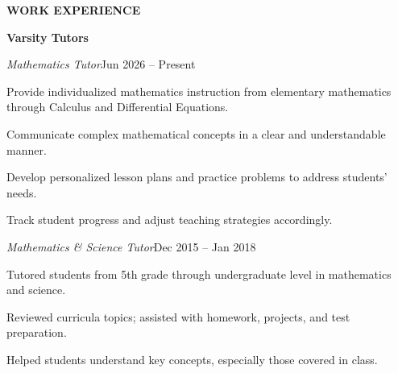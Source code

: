 \documentclass[a4paper, 12pt]{article}
\newcommand{\workplace}[1]{%
  \noindent\textbf{#1}\par
}
\newcommand{\workrole}[2]{%
  \noindent\hspace*{1em}\textit{#1}\hfill #2\par
}
\begin{document}
\begin{flushleft}
\faSuitcase\quad\textbf{WORK EXPERIENCE}\\[4pt]

\noindent\begin{minipage}{\linewidth}
\workplace{Varsity Tutors}
\workrole{Mathematics Tutor}{Jun 2026 -- Present}
\begin{compactitem}
    \item Provide individualized mathematics instruction from elementary mathematics
          through Calculus and Differential Equations.
    \item Communicate complex mathematical concepts in a clear and understandable manner.
    \item Develop personalized lesson plans and practice problems to address students' needs.
    \item Track student progress and adjust teaching strategies accordingly.
\end{compactitem}
\vspace{4pt}
\workrole{Mathematics \& Science Tutor}{Dec 2015 -- Jan 2018}
\begin{compactitem}
    \item Tutored students from 5th grade through undergraduate level in mathematics and science.
    \item Reviewed curricula topics; assisted with homework, projects, and test preparation.
    \item Helped students understand key concepts, especially those covered in class.
\end{compactitem}
\end{minipage}

\vspace{8pt}


\end{flushleft}
\end{document}
